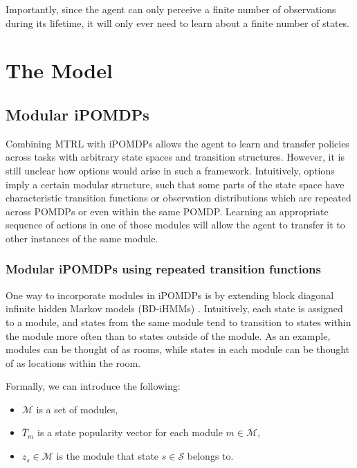 \documentclass[11pt]{article}
\begin{document}
Importantly, since the agent can only perceive a finite number of observations during its lifetime, it will only ever need to learn about a finite number of states.

\section{The Model}

\subsection{Modular iPOMDPs}

Combining MTRL with iPOMDPs allows the agent to learn and transfer policies across tasks with arbitrary state spaces and transition structures. However, it is still unclear how options would arise in such a framework. Intuitively, options imply a certain modular structure, such that some parts of the state space have characteristic transition functions or observation distributions which are repeated across POMDPs or even within the same POMDP. Learning an appropriate sequence of actions in one of those modules will allow the agent to transfer it to other instances of the same module. 

\subsubsection{Modular iPOMDPs using repeated transition functions}

One way to incorporate modules in iPOMDPs is by extending block diagonal infinite hidden Markov models (BD-iHMMs) \cite{Stepleton2009}. Intuitively, each state is assigned to a module, and states from the same module tend to transition to states within the module more often than to states outside of the module. As an example, modules can be thought of as rooms, while states in each module can be thought of as locations within the room.

Formally, we can introduce the following:

\begin{itemize}
\item $\mathcal{M}$ is a set of modules,
\item $\bar{T}_m$ is a state popularity vector for each module $m \in \mathcal{M}$,
\item $z_s \in \mathcal{M}$ is the module that state $s \in \mathcal{S}$ belongs to.
\end{itemize}
\end{document}
